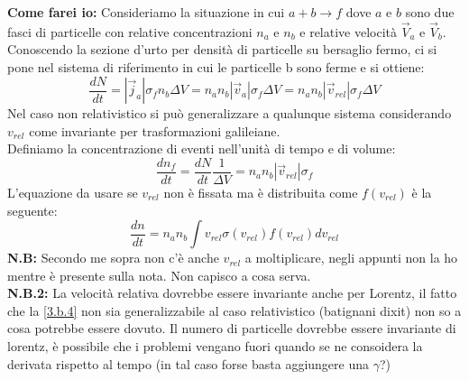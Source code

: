 \documentclass[twoside]{article}
\begin{document}
\textbf{Come farei io:}
Consideriamo la situazione in cui $a+b\rightarrow f$ dove $a$ e $b$ sono due fasci di particelle con relative concentrazioni $n_a$ e $n_b$ e relative velocità $\vec{V}_a$ e $\vec{V}_b$.\\
Conoscendo la sezione d'urto per densità di particelle su bersaglio fermo, ci si pone nel sistema di riferimento in cui le particelle b sono ferme e si ottiene:
\begin{equation}
    \frac{dN}{dt}=|\vec{j}_a|\sigma_f n_b\Delta V=n_an_b|\vec{v}_a|\sigma_f\Delta V=n_an_b|\vec{v}_{rel}|\sigma_f\Delta V
\end{equation}
Nel caso non relativistico si può generalizzare a qualunque sistema considerando $v_{rel}$ come invariante per trasformazioni galileiane.\\
Definiamo la concentrazione di eventi nell'unità di tempo e di volume:
\begin{equation}\label{3.b.4}
    \frac{dn_f}{dt}= \frac{dN}{dt}\frac{1}{\Delta V}=n_an_b|\vec{v}_{rel}|\sigma_f
\end{equation}
L'equazione da usare se $v_{rel}$ non è fissata ma è distribuita come $f(v_{rel})$ è la seguente:
\begin{equation}
    \frac{dn}{dt}=n_an_b\int v_{rel}\sigma(v_{rel})f(v_{rel})dv_{rel}
\end{equation}
\textbf{N.B:} Secondo me sopra non c'è anche $v_{rel}$ a moltiplicare, negli appunti non la ho mentre è presente sulla nota. Non capisco a cosa serva.\\
\textbf{N.B.2:} La velocità relativa dovrebbe essere invariante anche per Lorentz, il fatto che la \ref{3.b.4} non sia generalizzabile al caso relativistico (batignani dixit) non so a cosa potrebbe essere dovuto. Il numero di particelle dovrebbe essere invariante di lorentz, è possibile che i problemi vengano fuori quando se ne consoidera la derivata rispetto al tempo (in tal caso forse basta aggiungere una $\gamma$?)
\end{document}
